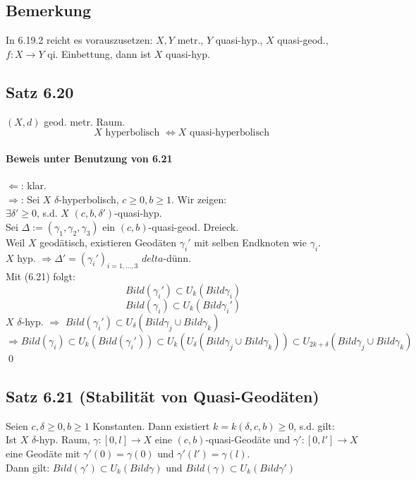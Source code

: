 \documentclass{article}
\begin{document}
\subsection{Bemerkung}
In 6.19.2 reicht es vorauszusetzen: $X,Y$ metr., $Y$ quasi-hyp., $X$ quasi-geod., $f: X \rightarrow Y$ qi. Einbettung, dann ist $X$ quasi-hyp.

\subsection{Satz 6.20}
$(X,d)$ geod. metr. Raum.
\[X \text{ hyperbolisch } \Longleftrightarrow X \text{ quasi-hyperbolisch }  \]

\paragraph{Beweis unter Benutzung von 6.21}
$\Longleftarrow$: klar.\\
$\Longrightarrow$: Sei $X$ $\delta$-hyperbolisch, $c \geq 0,b \geq 1$. Wir zeigen:\\
$\exists \delta' \geq 0$, s.d. $X$ $(c,b,\delta')$-quasi-hyp.\\
Sei $\Delta := (\gamma_1, \gamma_2, \gamma_3)$ ein $(c,b)$-quasi-geod. Dreieck.\\
Weil $X$ geodätisch, existieren Geodäten $\gamma_i'$ mit selben Endknoten wie $\gamma_i$.\\
$X$ hyp. $\Longrightarrow \Delta' =(\gamma_i')_{i = 1,\ldots, 3}$ $delta$-dünn.\\
Mit (6.21) folgt:
\[Bild(\gamma_i') \subset U_k(Bild \gamma_i) \]
\[Bild(\gamma_i) \subset U_k(Bild \gamma_i') \]
$X$ $\delta$-hyp. $\Longrightarrow$ $Bild(\gamma_i') \subset U_\delta(Bild \gamma_j \cup Bild \gamma_k)$\\
$\Longrightarrow Bild(\gamma_i) \subset U_k(Bild(\gamma_i')) \subset  U_k(U_\delta (Bild\gamma_j \cup Bild \gamma_k)) \subset U_{2k + \delta}(Bild\gamma_j \cup Bild \gamma_k)$\qed


\subsection{Satz 6.21 (Stabilität von Quasi-Geodäten)}
Seien $c,\delta \geq 0, b \geq 1$ Konstanten. Dann existiert $k = k(\delta, c,b) \geq 0$, s.d. gilt:\\
Ist $X$ $\delta$-hyp. Raum, $\gamma : [0,l] \rightarrow X$ eine $(c,b)$-quasi-Geodäte und $\gamma' : [0,l'] \rightarrow X$ eine Geodäte mit $\gamma'(0) = \gamma(0)$ und $\gamma'(l') = \gamma(l)$.\\
Dann gilt: $Bild(\gamma') \subset U_k(Bild \gamma)$ und $Bild(\gamma) \subset U_k(Bild \gamma')$
\end{document}
